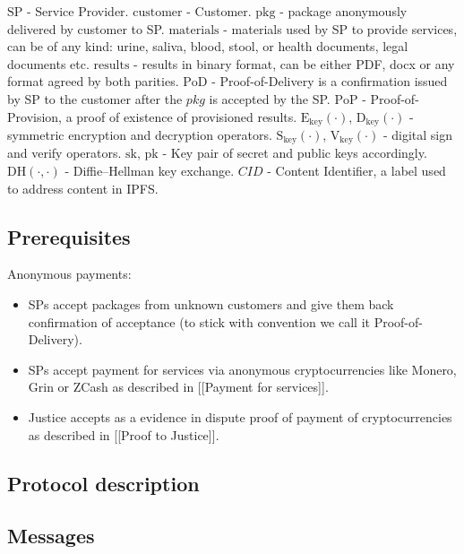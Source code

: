 \documentclass{ieeeaccess}
\begin{document}
\(\mathrm{SP}\) - Service Provider. \(\mathrm{customer}\) - Customer.
\(\mathrm{pkg}\) - package anonymously delivered by customer to SP.
\(\mathrm{materials}\) - materials used by SP to provide services, can
be of any kind: urine, saliva, blood, stool, or health documents, legal
documents etc. \(\mathrm{results}\) - results in binary format, can be
either PDF, docx or any format agreed by both parities. \(\mathrm{PoD}\)
- Proof-of-Delivery is a confirmation issued by SP to the customer after
the \(pkg\) is accepted by the SP. \(\mathrm{PoP}\) -
Proof-of-Provision, a proof of existence of provisioned results.
\(\mathrm{E}_\mathrm{key}(\cdot)\), \(\mathrm{D}_\mathrm{key}(\cdot)\) -
symmetric encryption and decryption operators.
\(\mathrm{S}_\mathrm{key}(\cdot)\), \(\mathrm{V}_\mathrm{key}(\cdot)\) -
digital sign and verify operators. \(\mathrm{sk}\), \(\mathrm{pk}\) -
Key pair of secret and public keys accordingly.
\(\mathrm{DH}(\cdot, \cdot)\) - Diffie--Hellman key exchange. \(CID\) -
Content Identifier, a label used to address content in IPFS.

\subsection{Prerequisites}

Anonymous payments:

\begin{itemize}

\item
  SPs accept packages from unknown customers and give them back
  confirmation of acceptance (to stick with convention we call it
  Proof-of-Delivery).
\item
  SPs accept payment for services via anonymous cryptocurrencies like
  Monero, Grin or ZCash as described in {[}{[}Payment for
  services{]}{]}.
\item
  Justice accepts as a evidence in dispute proof of payment of
  cryptocurrencies as described in {[}{[}Proof to Justice{]}{]}.
\end{itemize}


\subsection{Protocol description}

\subsection{Messages}\label{messages}
\end{document}

